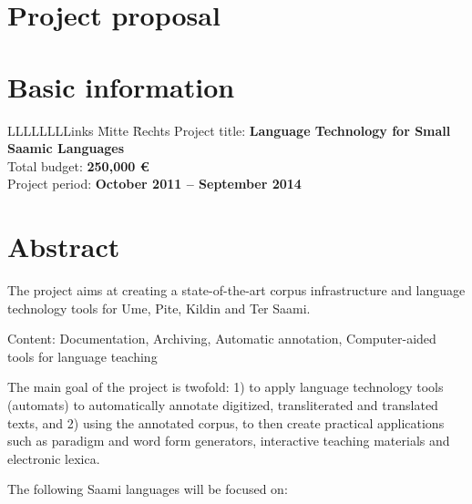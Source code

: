 \documentclass[a4paper,12pt]{article}
\begin{document}
\newpage

\section*{Project proposal}

\section{Basic information}

\begin{tabbing}
LLLLLLLLinks \= Mitte \= Rechts \kill
Project title: \>\textbf{Language Technology for Small Saamic Languages}\\
Total budget: \>\textbf{250,000 €}\\
Project period: \>\textbf{October 2011 – September 2014}\\
\end{tabbing}

\section{Abstract}%

The project aims at creating a state-of-the-art corpus infrastructure and language technology tools for Ume, Pite, Kildin and Ter Saami.

Content: Documentation, Archiving, Automatic annotation, Computer-aided tools for language teaching

The main goal of the project is twofold: 1) to apply language technology tools (automats) %
to automatically annotate digitized, transliterated and translated texts, and 2) using the annotated corpus, to then create practical applications such as paradigm and word form generators, interactive teaching materials and electronic lexica.

The following Saami languages will be focused on:
\end{document}
